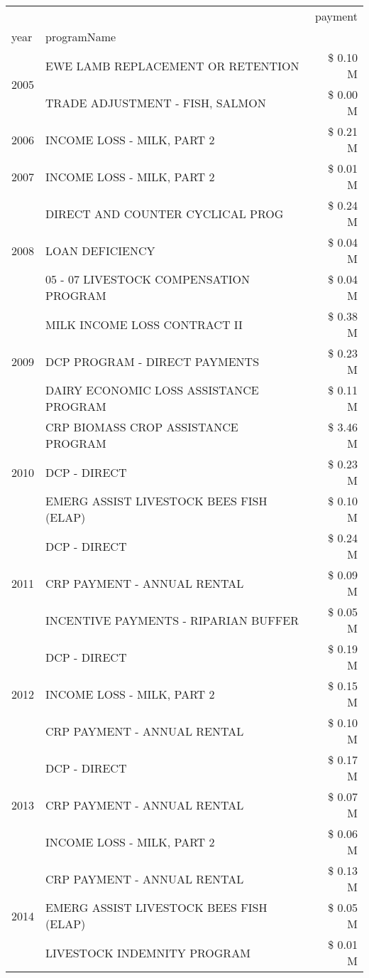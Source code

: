\begin{tabular}{llr}
\toprule
 &  & payment \\
year & programName &  \\
\midrule
\multirow[t]{2}{*}{2005} & EWE LAMB REPLACEMENT OR RETENTION & \$ 0.10 M \\
 & TRADE ADJUSTMENT - FISH, SALMON & \$ 0.00 M \\
\cline{1-3}
2006 & INCOME LOSS - MILK, PART 2 & \$ 0.21 M \\
\cline{1-3}
2007 & INCOME LOSS - MILK, PART 2 & \$ 0.01 M \\
\cline{1-3}
\multirow[t]{3}{*}{2008} & DIRECT AND COUNTER CYCLICAL PROG & \$ 0.24 M \\
 & LOAN DEFICIENCY & \$ 0.04 M \\
 & 05 - 07 LIVESTOCK COMPENSATION PROGRAM & \$ 0.04 M \\
\cline{1-3}
\multirow[t]{3}{*}{2009} & MILK INCOME LOSS CONTRACT II & \$ 0.38 M \\
 & DCP PROGRAM - DIRECT PAYMENTS & \$ 0.23 M \\
 & DAIRY ECONOMIC LOSS ASSISTANCE PROGRAM & \$ 0.11 M \\
\cline{1-3}
\multirow[t]{3}{*}{2010} & CRP BIOMASS CROP ASSISTANCE PROGRAM & \$ 3.46 M \\
 & DCP - DIRECT & \$ 0.23 M \\
 & EMERG ASSIST LIVESTOCK BEES FISH (ELAP) & \$ 0.10 M \\
\cline{1-3}
\multirow[t]{3}{*}{2011} & DCP - DIRECT & \$ 0.24 M \\
 & CRP PAYMENT - ANNUAL RENTAL & \$ 0.09 M \\
 & INCENTIVE PAYMENTS - RIPARIAN BUFFER & \$ 0.05 M \\
\cline{1-3}
\multirow[t]{3}{*}{2012} & DCP - DIRECT & \$ 0.19 M \\
 & INCOME LOSS - MILK, PART 2 & \$ 0.15 M \\
 & CRP PAYMENT - ANNUAL RENTAL & \$ 0.10 M \\
\cline{1-3}
\multirow[t]{3}{*}{2013} & DCP - DIRECT & \$ 0.17 M \\
 & CRP PAYMENT - ANNUAL RENTAL & \$ 0.07 M \\
 & INCOME LOSS - MILK, PART 2 & \$ 0.06 M \\
\cline{1-3}
\multirow[t]{3}{*}{2014} & CRP PAYMENT - ANNUAL RENTAL & \$ 0.13 M \\
 & EMERG ASSIST LIVESTOCK BEES FISH (ELAP) & \$ 0.05 M \\
 & LIVESTOCK INDEMNITY PROGRAM & \$ 0.01 M \\

\end{tabular}
